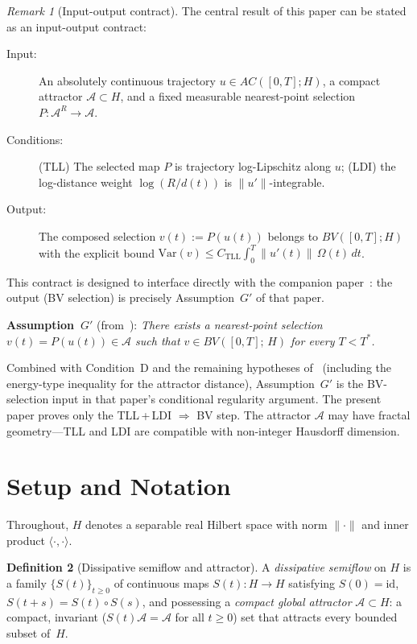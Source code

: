 \documentclass[12pt,a4paper]{article}
\theoremstyle{definition}
\newtheorem{definition}{Definition}[section]
\theoremstyle{plain}
\theoremstyle{remark}
\newtheorem{remark}[definition]{Remark}
\newcommand{\id}{\mathrm{id}}
\begin{document}
\begin{remark}[Input-output contract]
\label{rem:api-contract}
The central result of this paper can be stated as an input-output contract:
\begin{description}
\item[Input:] An absolutely continuous trajectory $u \in AC([0,T]; H)$, a compact attractor $\mathcal{A} \subset H$, and a fixed measurable nearest-point selection $P : \mathcal{A}^R \to \mathcal{A}$.
\item[Conditions:] (TLL) The selected map $P$ is trajectory log-Lipschitz along $u$; (LDI) the log-distance weight $\log(R/d(t))$ is $\|u'\|$-integrable.
\item[Output:] The composed selection $v(t) := P(u(t))$ belongs to $BV([0,T]; H)$ with the explicit bound $\mathrm{Var}(v) \leq C_{\mathrm{TLL}} \int_0^T \|u'(t)\| \,\Omega(t)\,dt$.
\end{description}
This contract is designed to interface directly with the companion paper~\cite{FST-NS2026}: the output (BV selection) is precisely Assumption~$G'$ of that paper.

\smallskip\noindent
\textbf{Assumption~$G'$} (from~\cite{FST-NS2026}):
\emph{There exists a nearest-point selection
$v(t) = P(u(t)) \in \mathcal{A}$ such that
$v \in BV([0,T];\,H)$ for every $T < T^*$.}

\smallskip\noindent
Combined with Condition~D and the remaining hypotheses of~\cite{FST-NS2026} (including the energy-type inequality for the attractor distance), Assumption~$G'$ is the BV-selection input in that paper's conditional regularity argument.  The present paper proves only the TLL\,+\,LDI $\Rightarrow$ BV step.  The attractor $\mathcal{A}$ may have fractal geometry---TLL and LDI are compatible with non-integer Hausdorff dimension.
\end{remark}


\section{Setup and Notation}

Throughout, $H$ denotes a separable real Hilbert space with norm
$\|\cdot\|$ and inner product $\langle\cdot,\cdot\rangle$.

\begin{definition}[Dissipative semiflow and attractor]
\label{def:semiflow}
A \emph{dissipative semiflow} on $H$ is a family
$\{S(t)\}_{t \ge 0}$ of continuous maps $S(t): H \to H$ satisfying
$S(0) = \id$, $S(t+s) = S(t) \circ S(s)$, and possessing a
\emph{compact global attractor}
$\mathcal{A} \subset H$: a compact, invariant
($S(t)\mathcal{A} = \mathcal{A}$ for all $t \ge 0$) set that
attracts every bounded subset of~$H$.
\end{definition}
\end{document}
